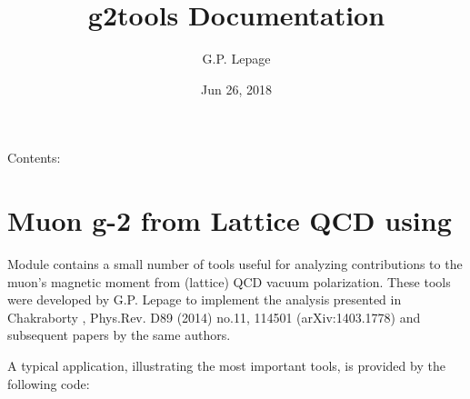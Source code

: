 \documentclass[letterpaper,10pt,english]{sphinxmanual}
\title{g2tools Documentation}
\date{Jun 26, 2018}
\author{G.P. Lepage}
\begin{document}
\maketitle
\sphinxtableofcontents
{}\label{\detokenize{index::doc}}


Contents:


\chapter{Muon g-2 from Lattice QCD using }
\label{\detokenize{overview:g2tools-documentation}}\label{\detokenize{overview:muon-g-2-from-lattice-qcd-using-g2tools}}\label{\detokenize{overview::doc}}
Module {\hyperref[\detokenize{g2tools:module-g2tools}]{}} contains a small number of tools useful for analyzing
contributions to the muon’s magnetic moment from (lattice) QCD vacuum
polarization. These tools were developed by G.P. Lepage to implement the
analysis presented in Chakraborty , Phys.Rev. D89 (2014) no.11, 114501
(arXiv:1403.1778) and subsequent papers by the same authors.

A typical application, illustrating the most important tools, is
provided by the following code:
\end{document}
